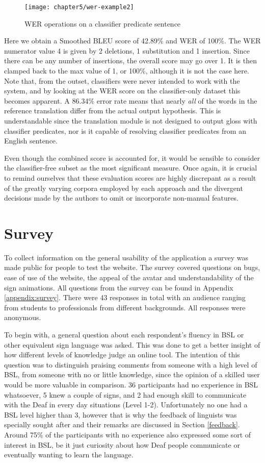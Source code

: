 \documentclass[12pt]{ociamthesis}  %
\begin{document}
\begin{figure}[H]
	\centering
    \texttt{[image: chapter5/wer-example2]}
    \caption{WER operations on a classifier predicate sentence}
    \label{fig:wer2}
\end{figure}	
Here we obtain a Smoothed BLEU score of 42.89\% and WER of 100\%. The WER numerator value 4 is given by 2 deletions, 1 substitution and 1 insertion. Since there can be any number of insertions, the overall score may go over 1. It is then clamped back to the max value of 1, or 100\%, although it is not the case here. Note that, from the outset, classifiers were never intended to work with the system, and by looking at the WER score on the classifier-only dataset this becomes apparent. A 86.34\% error rate means that nearly \textit{all} of the words in the reference translation differ from the actual output hypothesis. This is understandable since the translation module is not designed to output gloss with classifier predicates, nor is it capable of resolving classifier predicates from an English sentence. 

Even though the combined score is accounted for, it would be sensible to consider the classifier-free subset as the most significant measure. Once again, it is crucial to remind ourselves that these evaluation scores are highly discrepant as a result of the greatly varying corpora employed by each approach and the divergent decisions made by the authors to omit or incorporate non-manual features.

\section{Survey}

To collect information on the general usability of the application a survey was made public for people to test the website. The survey covered questions on bugs, ease of use of the website, the appeal of the avatar and understandability of the sign animations. All questions from the survey can be found in Appendix \ref{appendix:survey}. There were 43 responses in total with an audience ranging from students to professionals from different backgrounds. All responses were anonymous.

To begin with, a general question about each respondent's fluency in BSL or other equivalent sign language was asked. This was done to get a better insight of how different levels of knowledge judge an online tool. The intention of this question was to distinguish praising comments from someone with a high level of BSL, from someone with no or little knowledge, since the opinion of a skilled user would be more valuable in comparison. 36 participants had no experience in BSL whatsoever, 5 knew a couple of signs, and 2 had enough skill to communicate with the Deaf in every day situations (Level 1-2). Unfortunately no one had a BSL level higher than 3, however that is why the feedback of linguists was specially sought after and their remarks are discussed in Section \ref{feedback}. Around 75\% of the participants with no experience also expressed some sort of interest in BSL, be it just curiosity about how Deaf people communicate or eventually wanting to learn the language.
\end{document}
